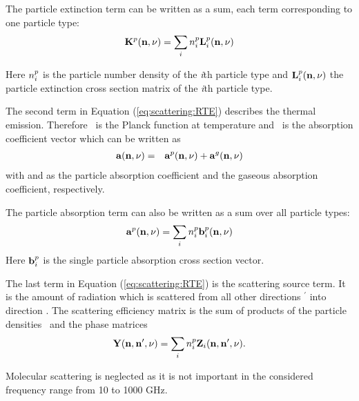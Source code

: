 The particle extinction term can be written as a sum, each term
corresponding to one particle type:
\begin{eqnarray}
  {\bf K}^{p}({\bf n}, \nu) = \sum_i n^p_i {\bf L}^{p}_i ({\bf n}, \nu)
\end{eqnarray}

Here $n^p_i$ is the particle number density of the
{\sl i}th particle type and  ${\bf L}^{p}_i({\bf n}, \nu)$  the particle
extinction cross section matrix of the
{\sl i}th particle type.

The second term in Equation (\ref{eq:scattering:RTE})  describes the thermal
emission. Therefore \Planck\  is the Planck
function at temperature \Tmp and \AbsVec\  is the absorption
coefficient vector which can be written as
 \begin{eqnarray}
  {\bf a} ({\bf n}, \nu)  &=& {\bf a}^{p} ({\bf n}, \nu) + {\bf a}^{g} ({\bf n}, \nu) 
  \end{eqnarray}
with  and  as the particle
absorption 
coefficient
and the gaseous absorption coefficient, respectively. 

The particle absorption term can also be written as a sum over all
particle types:
\begin{eqnarray}
  {\bf a}^{p}({\bf n}, \nu) = \sum_i n^p_i {\bf b}^{p}_i ({\bf n}, \nu)
\end{eqnarray}
Here ${\bf b}^{p}_i$ is the single particle absorption cross section
vector. 

The last term in Equation (\ref{eq:scattering:RTE}) is the scattering source
term. It is the 
amount of radiation which is scattered from all other directions \PDir$^\prime$   
into direction \PDir.  The scattering efficiency matrix
\SEfMat is the sum of products  
of the particle densities \PDen\  and the phase matrices \PhaMat
\begin{eqnarray}
{\bf Y}({\bf n}, {\bf n}', \nu) = \sum_i{n^p_i{\bf Z}_i({\bf n}, {\bf n}', \nu)}.
\end{eqnarray}

Molecular scattering is neglected as it is not important in the 
considered frequency range from 10 to 1000 GHz. 

\label{sec:scattering:scalar_rte}

